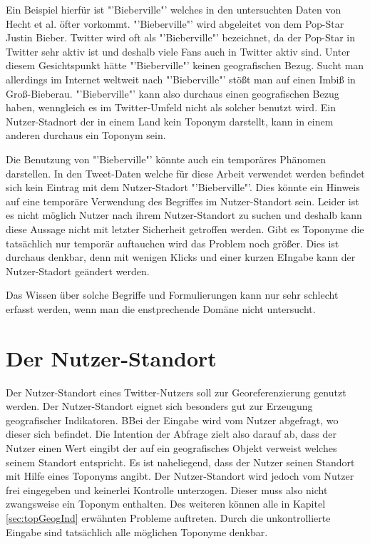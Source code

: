 			Ein Beispiel hierfür ist "'Bieberville"' welches in den untersuchten Daten von Hecht et al. öfter vorkommt.
			"'Bieberville"' wird abgeleitet von dem Pop-Star Justin Bieber.	
			Twitter wird oft als "'Bieberville"' bezeichnet, da der Pop-Star in Twitter sehr aktiv ist und deshalb viele Fans auch in Twitter aktiv sind.
			Unter diesem Gesichtspunkt hätte "'Bieberville"' keinen geografischen Bezug.
			Sucht man allerdings im Internet weltweit nach "'Bieberville"' stößt man auf einen Imbiß in Groß-Bieberau.
			"'Bieberville"' kann also durchaus einen geografischen Bezug haben, wenngleich es im Twitter-Umfeld nicht als solcher benutzt wird. 
			Ein Nutzer-Stadnort der in einem Land kein Toponym darstellt, kann in einem anderen durchaus ein Toponym sein.

			Die Benutzung von "'Bieberville"' könnte auch ein temporäres Phänomen darstellen. 
			In den Tweet-Daten welche für diese Arbeit verwendet werden befindet sich kein Eintrag mit dem Nutzer-Stadort "'Bieberville"'.
			Dies könnte ein Hinweis auf eine temporäre Verwendung des Begriffes im Nutzer-Standort sein.
			Leider ist es nicht möglich Nutzer nach ihrem Nutzer-Standort zu suchen und deshalb kann diese Aussage nicht mit letzter Sicherheit getroffen werden. 
			Gibt es Toponyme die tatsächlich nur temporär auftauchen wird das Problem noch größer. 
			Dies ist durchaus denkbar, denn mit wenigen Klicks und einer kurzen EIngabe kann der Nutzer-Stadort geändert werden.

			Das Wissen über solche Begriffe und Formulierungen kann nur sehr schlecht erfasst werden, wenn man die enstprechende Domäne nicht untersucht. 
			

			
	\section{Der Nutzer-Standort} \label{sec:nutzerStandort} 

		Der Nutzer-Standort eines Twitter-Nutzers soll zur Georeferenzierung genutzt werden. 
		Der Nutzer-Standort eignet sich besonders gut zur Erzeugung geografischer Indikatoren.
		BBei der Eingabe wird vom Nutzer abgefragt, wo dieser sich befindet. 
		Die Intention der Abfrage zielt also darauf ab, dass der Nutzer einen Wert eingibt der auf ein geografisches Objekt verweist welches seinem Standort entspricht. 
		Es ist naheliegend, dass der Nutzer seinen Standort mit Hilfe eines Toponyms angibt.
		Der Nutzer-Standort wird jedoch vom Nutzer frei eingegeben und keinerlei Kontrolle unterzogen.
		Dieser muss also nicht zwangsweise ein Toponym enthalten. 
		Des weiteren können alle in Kapitel \ref{sec:topGeogInd} erwähnten Probleme auftreten.
		Durch die unkontrollierte Eingabe sind tatsächlich alle möglichen Toponyme denkbar.   
		
